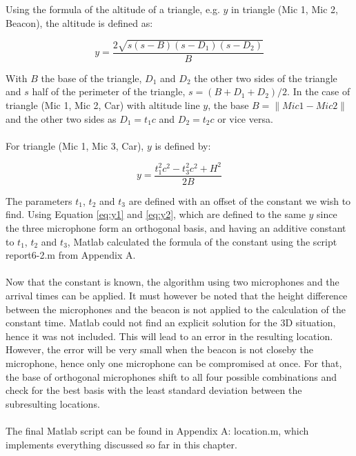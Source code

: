 \documentclass[final]{scrreprt} %
\begin{document}
Using the formula of the altitude of a triangle, e.g. $y$ in triangle (Mic 1, Mic 2, Beacon), the altitude is defined as:

\begin{equation}
	y = \frac{2 \sqrt{s(s - B)(s - D_1)(s - D_2)}}{B}
\label{eq:y1}
\end{equation}

With $B$ the base of the triangle, $D_1$ and $D_2$ the other two sides of the triangle and $s$ half of the perimeter of the triangle, $s = (B + D_1 + D_2) / 2$.
In the case of triangle (Mic 1, Mic 2, Car) with altitude line $y$, the base $B = \lVert Mic 1 - Mic 2 \rVert$ and the other two sides as $D_1 = t_1 c$ and $D_2 = t_2 c$ or vice versa.
\\ \\
For triangle (Mic 1, Mic 3, Car), $y$ is defined by:

\begin{equation}
	y = \frac{t_1^2 c^2 - t_3^2 c^2 + H^2}{2 B}
\label{eq:y2}
\end{equation}

The parameters $t_1$, $t_2$ and $t_3$ are defined with an offset of the constant we wish to find.
Using Equation \ref{eq:y1} and \ref{eq:y2}, which are defined to the same $y$ since the three microphone form an orthogonal basis, and having an additive constant to $t_1$, $t_2$ and $t_3$, Matlab calculated the formula of the constant using the script report6-2.m from Appendix A.
\\ \\
Now that the constant is known, the algorithm using two microphones and the arrival times can be applied.
It must however be noted that the height difference between the microphones and the beacon is not applied to the calculation of the constant time.
Matlab could not find an explicit solution for the 3D situation, hence it was not included.
This will lead to an error in the resulting location.
However, the error will be very small when the beacon is not closeby the microphone, hence only one microphone can be compromised at once.
For that, the base of orthogonal microphones shift to all four possible combinations and check for the best basis with the least standard deviation between the subresulting locations.
\\ \\
The final Matlab script can be found in Appendix A: location.m, which implements everything discussed so far in this chapter.
\end{document}
